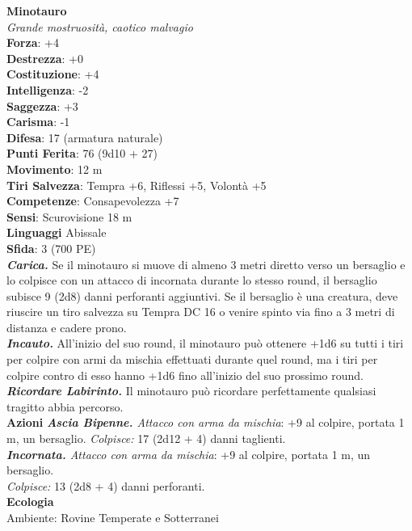 \begin{multicols}{2}
\medskip\textbf{Minotauro}\\
\emph{Grande mostruosità, caotico malvagio}\\
\textbf{Forza}: +4\\
\textbf{Destrezza}: +0\\
\textbf{Costituzione}: +4\\
\textbf{Intelligenza}: -2\\
\textbf{Saggezza}: +3\\
\textbf{Carisma}: -1\\
\textbf{Difesa}: 17 (armatura naturale)\\
\textbf{Punti Ferita}: 76 (9d10 + 27)\\
\textbf{Movimento}: 12 m\\
\textbf{Tiri Salvezza}: Tempra +6, Riflessi +5, Volontà +5\\
\textbf{Competenze}: Consapevolezza +7\\
\textbf{Sensi}: Scurovisione 18 m\\
\textbf{Linguaggi} Abissale\\
\textbf{Sfida}: 3 (700 PE)\smallskip\\
\emph{\textbf{Carica.}} Se il minotauro si muove di almeno 3 metri diretto verso un bersaglio e lo colpisce con un attacco di incornata durante lo stesso round, il bersaglio subisce 9 (2d8) danni perforanti aggiuntivi. Se il bersaglio è una creatura, deve riuscire un tiro salvezza su Tempra DC  16 o venire spinto via fino a 3 metri di distanza e cadere prono.\\
\emph{\textbf{Incauto.}} All'inizio del suo round, il minotauro può ottenere +1d6 su tutti i tiri per colpire con armi da mischia effettuati durante quel round, ma i tiri per colpire contro di esso hanno +1d6 fino all'inizio del suo prossimo round.\\
\emph{\textbf{Ricordare Labirinto.}} Il minotauro può ricordare perfettamente qualsiasi tragitto abbia percorso.\\
\smallskip\textbf{Azioni}  
\emph{\textbf{Ascia Bipenne.} Attacco con arma da mischia}: +9 al colpire, portata 1 m, un bersaglio.
\emph{Colpisce:} 17 (2d12 + 4) danni taglienti.\\
\emph{\textbf{Incornata.} Attacco con arma da mischia}: +9 al colpire, portata 1 m, un bersaglio.\\
\emph{Colpisce:} 13 (2d8 + 4) danni perforanti.\\
\textbf{Ecologia}\\
Ambiente: Rovine Temperate e Sotterranei\\

\end{multicols}
